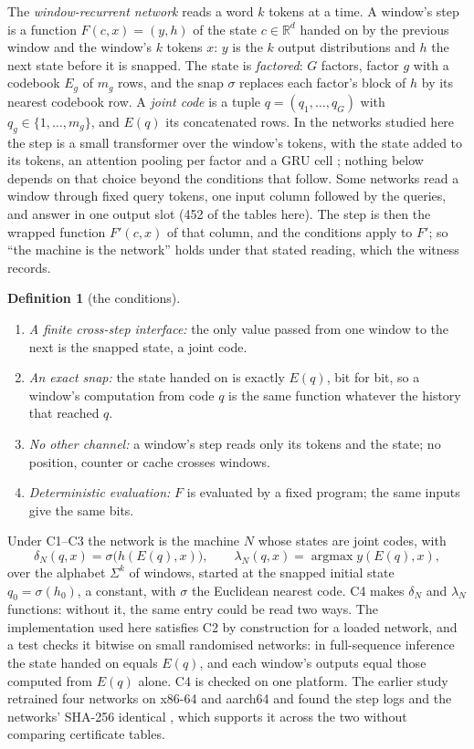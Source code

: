 \documentclass[11pt]{article}
\newcommand{\pn}[2]{#2}
\theoremstyle{definition}
\newtheorem{definition}[theorem]{Definition}
\begin{document}
The \emph{window-recurrent network} reads a word $k$ tokens at a time. A window's step is a function
$F(c, x) = (y, h)$ of the state $c \in \mathbb{R}^d$ handed on by the previous window and the window's
$k$ tokens $x$: $y$ is the $k$ output distributions and $h$ the next state before it is snapped. The
state is \emph{factored}: $G$ factors, factor $g$ with a codebook $E_g$ of $m_g$ rows, and the snap
$\sigma$ replaces each factor's block of $h$ by its nearest codebook row. A \emph{joint code} is a tuple
$q = (q_1, \dots, q_G)$ with $q_g \in \{1, \dots, m_g\}$, and $E(q)$ its concatenated rows. In the
networks studied here the step is a small transformer over the window's tokens, with the state added
to its tokens, an attention pooling per factor and a GRU cell \citep{cho-2014-rnn-encoder-decoder-gru};
nothing below depends on that choice beyond the conditions that follow. Some networks read a window
through fixed query tokens, one input column followed by the queries, and answer in one output slot
(\pn{recert-adapter-tables}{452} of the tables here). The step is then the wrapped function
$F'(c, x)$ of that column, and the conditions apply to $F'$; so ``the machine is the network'' holds
under that stated reading, which the witness records.

\begin{definition}[the conditions]
\leavevmode
\begin{enumerate}
\item[C1] \emph{A finite cross-step interface:} the only value passed from one window to the next is
the snapped state, a joint code.
\item[C2] \emph{An exact snap:} the state handed on is exactly $E(q)$, bit for bit, so a window's
computation from code $q$ is the same function whatever the history that reached $q$.
\item[C3] \emph{No other channel:} a window's step reads only its tokens and the state; no position,
counter or cache crosses windows.
\item[C4] \emph{Deterministic evaluation:} $F$ is evaluated by a fixed program; the same inputs give
the same bits.
\end{enumerate}
\end{definition}

Under C1--C3 the network is the machine $N$ whose states are joint codes, with
\[
\delta_N(q, x) = \sigma\big(h(E(q), x)\big), \qquad \lambda_N(q, x) = \operatorname{argmax} y(E(q), x),
\]
over the alphabet $\Sigma^k$ of windows, started at the snapped initial state $q_0 = \sigma(h_0)$, a
constant, with $\sigma$ the Euclidean nearest code. C4 makes $\delta_N$ and $\lambda_N$ functions:
without it, the same entry could be read two ways. The implementation used here satisfies C2 by
construction for a loaded network, and a test checks it bitwise on small randomised networks: in
full-sequence inference the state handed on equals $E(q)$, and each window's outputs equal those computed
from $E(q)$ alone. C4 is checked on one platform. The earlier study retrained four networks on x86-64 and
aarch64 and found the step logs and the networks' SHA-256 identical
\citep{barkhuizen-2026-learning-transducers-with-proof}, which supports it across the two without
comparing certificate tables.
\end{document}
